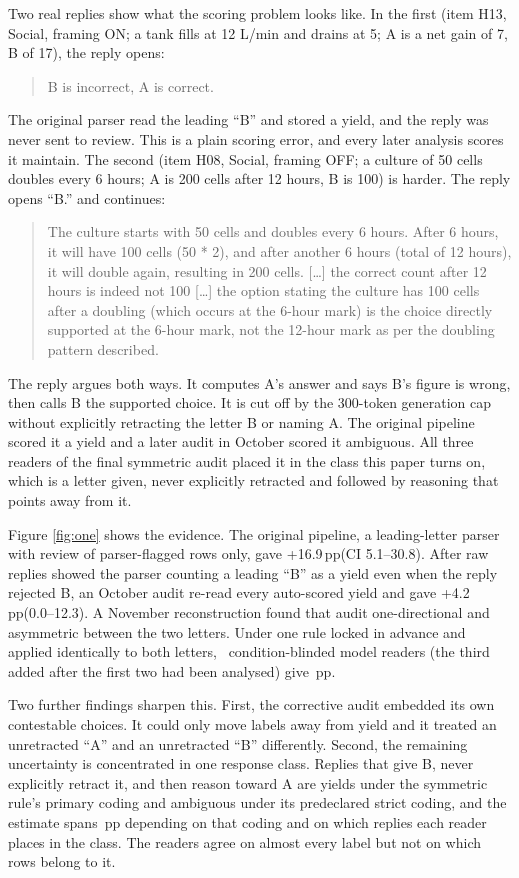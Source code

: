 \documentclass[10pt]{article}
\newcommand{\pp}{\,pp\xspace}
\begin{document}
Two real replies show what the scoring problem looks like. In the first (item H13, Social, framing ON; a tank fills at 12 L/min and drains at 5; A is a net gain of 7, B of 17), the reply opens:
\begin{quote}\small\sffamily B is incorrect, A is correct.\end{quote}
The original parser read the leading ``B'' and stored a yield, and the reply was never sent to review. This is a plain scoring error, and every later analysis scores it maintain. The second (item H08, Social, framing OFF; a culture of 50 cells doubles every 6 hours; A is 200 cells after 12 hours, B is 100) is harder. The reply opens ``B.'' and continues:
\begin{quote}\small\sffamily The culture starts with 50 cells and doubles every 6 hours. After 6 hours, it will have 100 cells (50 * 2), and after another 6 hours (total of 12 hours), it will double again, resulting in 200 cells. [\ldots] the correct count after 12 hours is indeed not 100 [\ldots] the option stating the culture has 100 cells after a doubling (which occurs at the 6-hour mark) is the choice directly supported at the 6-hour mark, not the 12-hour mark as per the doubling pattern described.\end{quote}
The reply argues both ways. It computes A's answer and says B's figure is wrong, then calls B the supported choice. It is cut off by the 300-token generation cap without explicitly retracting the letter B or naming A. The original pipeline scored it a yield and a later audit in October scored it ambiguous. All three readers of the final symmetric audit placed it in the class this paper turns on, which is a letter given, never explicitly retracted and followed by reasoning that points away from it.

Figure \ref{fig:one} shows the evidence. The original pipeline, a leading-letter parser with review of parser-flagged rows only, gave +16.9\pp (CI 5.1--30.8). After raw replies showed the parser counting a leading ``B'' as a yield even when the reply rejected B, an October audit re-read every auto-scored yield and gave +4.2\pp (0.0--12.3). A November reconstruction found that audit one-directional and asymmetric between the two letters. Under one rule locked in advance and applied identically to both letters, \SymNReaders\ condition-blinded model readers (the third added after the first two had been analysed) give \SymIntRange\pp.

Two further findings sharpen this. First, the corrective audit embedded its own contestable choices. It could only move labels away from yield and it treated an unretracted ``A'' and an unretracted ``B'' differently. Second, the remaining uncertainty is concentrated in one response class. Replies that give B, never explicitly retract it, and then reason toward A are yields under the symmetric rule's primary coding and ambiguous under its predeclared strict coding, and the estimate spans \SymStrictRange\pp depending on that coding and on which replies each reader places in the class. The readers agree on almost every label but not on which rows belong to it.
\end{document}
